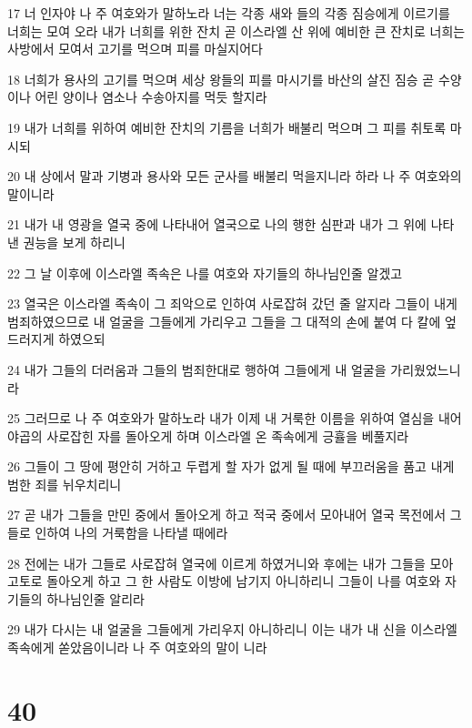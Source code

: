 \par 17 너 인자야 나 주 여호와가 말하노라 너는 각종 새와 들의 각종 짐승에게 이르기를 너희는 모여 오라 내가 너희를 위한 잔치 곧 이스라엘 산 위에 예비한 큰 잔치로 너희는 사방에서 모여서 고기를 먹으며 피를 마실지어다
\par 18 너희가 용사의 고기를 먹으며 세상 왕들의 피를 마시기를 바산의 살진 짐승 곧 수양이나 어린 양이나 염소나 수송아지를 먹듯 할지라
\par 19 내가 너희를 위하여 예비한 잔치의 기름을 너희가 배불리 먹으며 그 피를 취토록 마시되
\par 20 내 상에서 말과 기병과 용사와 모든 군사를 배불리 먹을지니라 하라 나 주 여호와의 말이니라
\par 21 내가 내 영광을 열국 중에 나타내어 열국으로 나의 행한 심판과 내가 그 위에 나타낸 권능을 보게 하리니
\par 22 그 날 이후에 이스라엘 족속은 나를 여호와 자기들의 하나님인줄 알겠고
\par 23 열국은 이스라엘 족속이 그 죄악으로 인하여 사로잡혀 갔던 줄 알지라 그들이 내게 범죄하였으므로 내 얼굴을 그들에게 가리우고 그들을 그 대적의 손에 붙여 다 칼에 엎드러지게 하였으되
\par 24 내가 그들의 더러움과 그들의 범죄한대로 행하여 그들에게 내 얼굴을 가리웠었느니라
\par 25 그러므로 나 주 여호와가 말하노라 내가 이제 내 거룩한 이름을 위하여 열심을 내어 야곱의 사로잡힌 자를 돌아오게 하며 이스라엘 온 족속에게 긍휼을 베풀지라
\par 26 그들이 그 땅에 평안히 거하고 두렵게 할 자가 없게 될 때에 부끄러움을 품고 내게 범한 죄를 뉘우치리니
\par 27 곧 내가 그들을 만민 중에서 돌아오게 하고 적국 중에서 모아내어 열국 목전에서 그들로 인하여 나의 거룩함을 나타낼 때에라
\par 28 전에는 내가 그들로 사로잡혀 열국에 이르게 하였거니와 후에는 내가 그들을 모아 고토로 돌아오게 하고 그 한 사람도 이방에 남기지 아니하리니 그들이 나를 여호와 자기들의 하나님인줄 알리라
\par 29 내가 다시는 내 얼굴을 그들에게 가리우지 아니하리니 이는 내가 내 신을 이스라엘 족속에게 쏟았음이니라 나 주 여호와의 말이 니라

\chapter{40}

